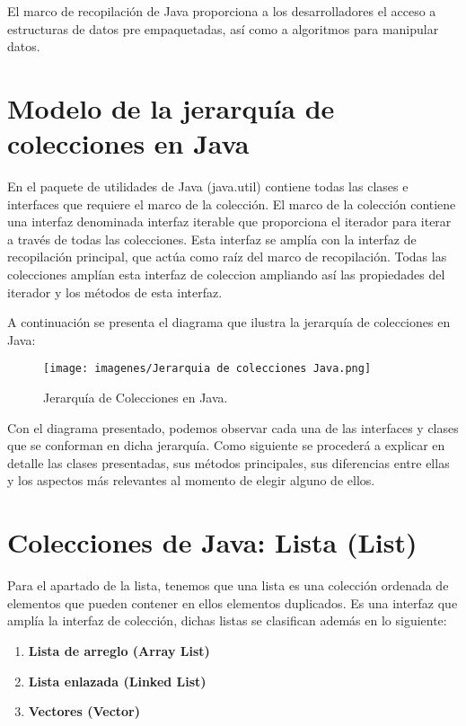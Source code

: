 \documentclass[12pt, letterpaper]{article} %
\begin{document}
El marco de recopilación de Java proporciona a los desarrolladores el acceso a estructuras de datos pre empaquetadas, así como a algoritmos para manipular datos.

\section*{Modelo de la jerarquía de colecciones en Java}
En el paquete de utilidades de Java (java.util) contiene todas las clases e interfaces que requiere el marco de la colección. El marco de la colección contiene una interfaz denominada interfaz iterable que proporciona el iterador para iterar a través de todas las colecciones. Esta interfaz se amplía con la interfaz de recopilación principal, que actúa como raíz del marco de recopilación. Todas las colecciones amplían esta interfaz de coleccion ampliando así las propiedades del iterador y los métodos de esta interfaz.

A continuación se presenta el diagrama que ilustra la jerarquía de colecciones en Java:
\begin{figure}[h]
    \centering
    \texttt{[image: imagenes/Jerarquia de colecciones Java.png]}
    \caption{Jerarquía de Colecciones en Java.}
    \label{fig:jerarquia}
\end{figure}

Con el diagrama presentado, podemos observar cada una de las interfaces y clases que se conforman en dicha jerarquía. Como siguiente se procederá a explicar en detalle  las clases presentadas, sus métodos principales, sus diferencias entre ellas y los aspectos más relevantes al momento de elegir alguno de ellos.

\section{Colecciones de Java: Lista (List)}
Para el apartado de la lista, tenemos que una lista es una colección ordenada de elementos que pueden contener en ellos elementos duplicados. Es una interfaz que amplía la interfaz de colección, dichas listas se clasifican además en lo siguiente:

\begin{enumerate}
    \item \textbf{Lista de arreglo (Array List)}
    \item \textbf{Lista enlazada (Linked List)}
    \item \textbf{Vectores (Vector)}
\end{enumerate}
\end{document}
